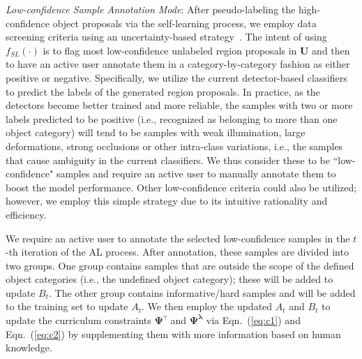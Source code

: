 \documentclass[journal]{IEEEtran}
\begin{document}
{\textit{Low-confidence Sample Annotation {Mode}}: 
After pseudo-labeling the high-confidence object proposals via the self-learning process, we employ data screening criteria using an {uncertainty-based strategy~\cite{lewis1994sequential,tong2002support}}. {The intent of using $f_{SL}(\cdot)$} is to flag most low-confidence unlabeled region proposals in $\mathbf{U}$ and then to have an active user annotate them in a category-by-category fashion as either positive or negative. Specifically, we utilize the current detector-based classifiers to predict the labels of the generated region proposals. In practice, as the detectors become better trained and more reliable, the samples with two or more labels predicted to be positive (i.e., recognized as belonging to more than one object category) will tend to be samples with weak illumination, large deformations, strong occlusions or other intra-class variations, i.e., the samples that cause ambiguity in the current classifiers. We thus consider these to be ``low-confidence" samples and require an active user to manually annotate them to boost the model performance. Other low-confidence criteria could also be utilized; however, we employ this simple strategy due to its intuitive rationality and efficiency. 

We require {an} active user to annotate the selected low-confidence samples in the $t$-th iteration of the AL process. After annotation, these samples {are} divided into two groups. One group contains samples that are outside the scope of the defined object categories (i.e., the undefined object category); these will be added to update $B_t$. The other group {contains} informative/hard samples and will be added to the training set to update $A_t$. We then employ the updated $A_t$ and $B_t$ to update the curriculum constraints $\mathbf{\Psi}^{\gamma}$ and $\mathbf{\Psi}^{\bm \lambda}$ via Eqn.~(\ref{eq:c1}) and Eqn.~(\ref{eq:c2}) by supplementing them with more {information} based on human knowledge.  

}
\end{document}
